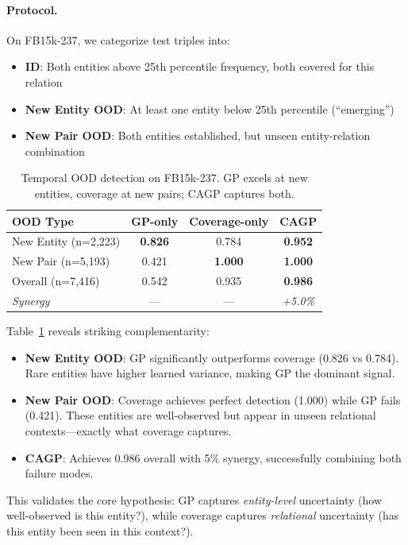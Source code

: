 \paragraph{Protocol.}
On FB15k-237, we categorize test triples into:
\begin{itemize}
    \item \textbf{ID}: Both entities above 25th percentile frequency, both covered for this relation
    \item \textbf{New Entity OOD}: At least one entity below 25th percentile (``emerging'')
    \item \textbf{New Pair OOD}: Both entities established, but unseen entity-relation combination
\end{itemize}

\begin{table}[t]
\centering
\caption{Temporal OOD detection on FB15k-237. GP excels at new entities, coverage at new pairs; CAGP captures both.}
\label{tab:temporal}
\vspace{0.5em}
\begin{tabular}{lccc}
\toprule
OOD Type & GP-only & Coverage-only & CAGP \\
\midrule
New Entity (n=2,223) & \textbf{0.826} & 0.784 & \textbf{0.952} \\
New Pair (n=5,193) & 0.421 & \textbf{1.000} & \textbf{1.000} \\
\midrule
Overall (n=7,416) & 0.542 & 0.935 & \textbf{0.986} \\
\emph{Synergy} & --- & --- & \emph{+5.0\%} \\
\bottomrule
\end{tabular}
\end{table}

Table~\ref{tab:temporal} reveals striking complementarity:
\begin{itemize}
    \item \textbf{New Entity OOD}: GP significantly outperforms coverage (0.826 vs 0.784). Rare entities have higher learned variance, making GP the dominant signal.
    \item \textbf{New Pair OOD}: Coverage achieves perfect detection (1.000) while GP fails (0.421). These entities are well-observed but appear in unseen relational contexts---exactly what coverage captures.
    \item \textbf{CAGP}: Achieves 0.986 overall with 5\% synergy, successfully combining both failure modes.
\end{itemize}

This validates the core hypothesis: GP captures \emph{entity-level} uncertainty (how well-observed is this entity?), while coverage captures \emph{relational} uncertainty (has this entity been seen in this context?).

